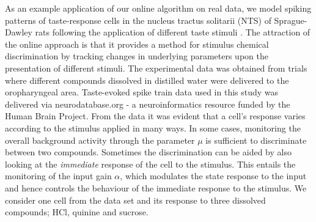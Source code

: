\documentclass[12pt]{article}
\begin{document}
As an example application of our online algorithm on real data, we model spiking patterns of
taste-response cells in the nucleus tractus solitarii (NTS) of Sprague-Dawley rats following the
application of different taste stimuli \cite{Lorenzo_2003}.  The attraction of the online approach
is that it provides a method for stimulus chemical discrimination by tracking changes in underlying
parameters upon the presentation of different stimuli.  The experimental data was obtained from
trials where different compounds dissolved in distilled water were delivered to the oropharyngeal area. Taste-evoked spike train data used in this study was delivered via neurodatabase.org - a neuroinformatics resource funded by
the Human Brain Project. From the data it was evident that a cell's response varies according to the stimulus applied in many ways. In some cases, monitoring the overall background activity through the parameter $\mu$ is sufficient to discriminate between two compounds. Sometimes the discrimination can be aided by also looking at the \emph{immediate} response of the cell to the stimulus. This entails the monitoring of the input gain $\alpha$, which modulates the state response to the input and hence controls the behaviour of the immediate response to the stimulus. We consider one cell from the data set and its response to three dissolved compounds; HCl, quinine and sucrose.


\end{document}
